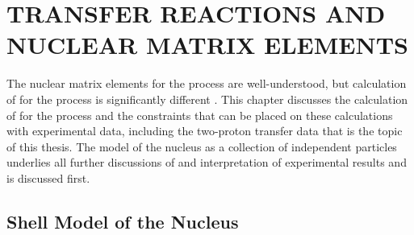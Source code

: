 %
%
%
%
%
%
%
%

%
%

\chapter{TRANSFER REACTIONS AND NUCLEAR MATRIX ELEMENTS}
\label{chap:nucl}

The nuclear matrix elements for the \tvbb process are well-understood, but calculation of \NME for the \zvbb process is significantly different \citep{VogelReview}.  This chapter discusses the calculation of \NME for the \zvbb process and the constraints that can be placed on these calculations with experimental data, including the two-proton transfer data that is the topic of this thesis.  The model of the nucleus as a collection of independent particles underlies all further discussions of \NME and interpretation of experimental results and is discussed first.    

\section{Shell Model of the Nucleus}

